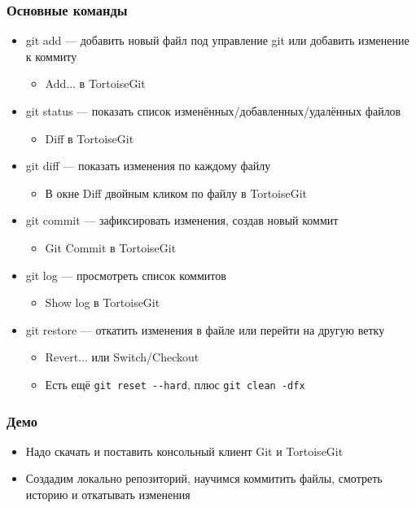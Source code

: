 \documentclass{../slides-style}
\begin{document}
    \begin{frame}[fragile]
        \frametitle{Основные команды}
        \begin{itemize}
            \item git add --- добавить новый файл под управление git или добавить изменение к коммиту
            \begin{itemize}
                \item Add... в TortoiseGit
            \end{itemize}
            \item git status --- показать список изменённых/добавленных/удалённых файлов
            \begin{itemize}
                \item Diff в TortoiseGit
            \end{itemize}
            \item git diff --- показать изменения по каждому файлу
            \begin{itemize}
                \item В окне Diff двойным кликом по файлу в TortoiseGit
            \end{itemize}
            \item git commit --- зафиксировать изменения, создав новый коммит
            \begin{itemize}
                \item Git Commit в TortoiseGit
            \end{itemize}
            \item git log --- просмотреть список коммитов
            \begin{itemize}
                \item Show log в TortoiseGit
            \end{itemize}
            \item git restore --- откатить изменения в файле или перейти на другую ветку
            \begin{itemize}
                \item Revert... или Switch/Checkout
                \item Есть ещё \verb|git reset --hard|, плюс \verb|git clean -dfx|
            \end{itemize}
        \end{itemize}
    \end{frame}

    \begin{frame}
        \frametitle{Демо}
        \begin{itemize}
            \item Надо скачать и поставить консольный клиент Git и TortoiseGit
            \item Создадим локально репозиторий, научимся коммитить файлы, смотреть историю и откатывать изменения
        \end{itemize}
    \end{frame}
\end{document}
